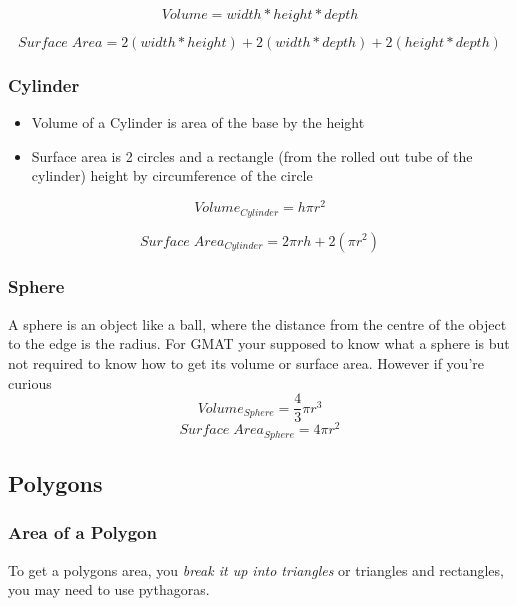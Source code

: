 \documentclass{article}
\begin{document}
\begin{equation}
Volume = width * height * depth
\end{equation}

\begin{equation}
Surface\;Area = 2(width * height) + 2(width * depth) + 2(height * depth)
\end{equation}

\subsubsection{Cylinder}
\begin{itemize}
\item Volume of a Cylinder is area of the base by the height
\item Surface area is 2 circles and a rectangle (from the rolled out tube of the cylinder) height by circumference of the circle
\end{itemize}

\begin{equation}
Volume_{ Cylinder} = h \pi r^ 2
\end{equation}


\begin{equation}
Surface\;Area_{ Cylinder} = 2 \pi r h + 2(\pi r^ 2 )
\end{equation}

\subsubsection{Sphere}
A sphere is an object like a ball, where the distance from the centre of the object to the edge is the radius. For GMAT your supposed to know what a sphere is but not required to know how to get its volume or surface area.
However if you're curious 
\begin{equation}
Volume_{Sphere} = \frac{4}{3} \pi r^{3}
\end{equation}
\begin{equation}
Surface\;Area_{Sphere} = 4 \pi r^{2}
\end{equation}

\newpage
\subsection{Polygons}
\subsubsection{Area of a Polygon}
To get a polygons area, you \textit{break it up into triangles} or triangles and rectangles, you may need to use pythagoras.
\end{document}
